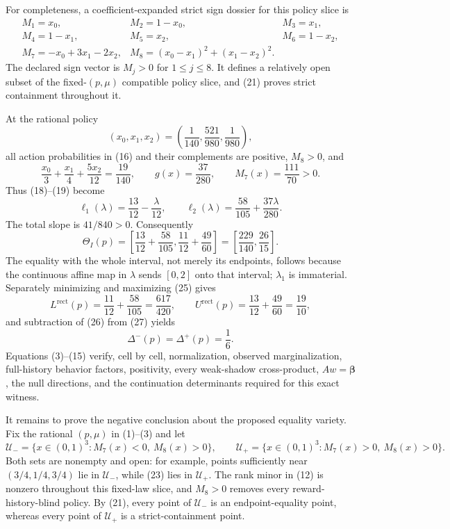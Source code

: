 For completeness, a coefficient-expanded strict sign dossier for this policy slice is
\[
\begin{array}{lll}
M_1=x_0,&M_2=1-x_0,&M_3=x_1,\\
M_4=1-x_1,&M_5=x_2,&M_6=1-x_2,\\
M_7=-x_0+3x_1-2x_2,
&M_8=(x_0-x_1)^2+(x_1-x_2)^2.&
\end{array}
\tag{22}
\]
The declared sign vector is \(M_j>0\) for \(1\leq j\leq8\). It defines a relatively open subset of the fixed-\((p,\mu)\) compatible policy slice, and (21) proves strict containment throughout it.

At the rational policy
\[
(x_0,x_1,x_2)=\left(\frac1{140},\frac{521}{980},\frac1{980}\right),
\tag{23}
\]
all action probabilities in (16) and their complements are positive, \(M_8>0\), and
\[
\frac{x_0}{3}+\frac{x_1}{4}+\frac{5x_2}{12}=\frac{19}{140},
\qquad g(x)=\frac{37}{280},
\qquad M_7(x)=\frac{111}{70}>0.
\tag{24}
\]
Thus (18)--(19) become
\[
\ell_1(\lambda)=\frac{13}{12}-\frac{\lambda}{12},
\qquad
\ell_2(\lambda)=\frac{58}{105}+\frac{37\lambda}{280}.
\tag{25}
\]
The total slope is \(41/840>0\). Consequently
\[
\Theta_I(p)=
\left[\frac{13}{12}+\frac{58}{105},
\frac{11}{12}+\frac{49}{60}\right]
=\left[\frac{229}{140},\frac{26}{15}\right].
\tag{26}
\]
The equality with the whole interval, not merely its endpoints, follows because the continuous affine map in \(\lambda\) sends \([0,2]\) onto that interval; \(\lambda_1\) is immaterial. Separately minimizing and maximizing (25) gives
\[
L^{\mathrm{rect}}(p)=\frac{11}{12}+\frac{58}{105}
=\frac{617}{420},
\qquad
U^{\mathrm{rect}}(p)=\frac{13}{12}+\frac{49}{60}
=\frac{19}{10},
\tag{27}
\]
and subtraction of (26) from (27) yields
\[
\Delta^-(p)=\Delta^+(p)=\frac16.
\tag{28}
\]
Equations (3)--(15) verify, cell by cell, normalization, observed marginalization, full-history behavior factors, positivity, every weak-shadow cross-product, \(Aw=\boldsymbol\beta\), the null directions, and the continuation determinants required for this exact witness.

It remains to prove the negative conclusion about the proposed equality variety. Fix the rational \((p,\mu)\) in (1)--(3) and let
\[
\mathcal U_-=\{x\in(0,1)^3:M_7(x)<0,\ M_8(x)>0\},
\qquad
\mathcal U_+=\{x\in(0,1)^3:M_7(x)>0,\ M_8(x)>0\}.
\tag{29}
\]
Both sets are nonempty and open: for example, points sufficiently near \((3/4,1/4,3/4)\) lie in \(\mathcal U_-\), while (23) lies in \(\mathcal U_+\). The rank minor in (12) is nonzero throughout this fixed-law slice, and \(M_8>0\) removes every reward-history-blind policy. By (21), every point of \(\mathcal U_-\) is an endpoint-equality point, whereas every point of \(\mathcal U_+\) is a strict-containment point.

